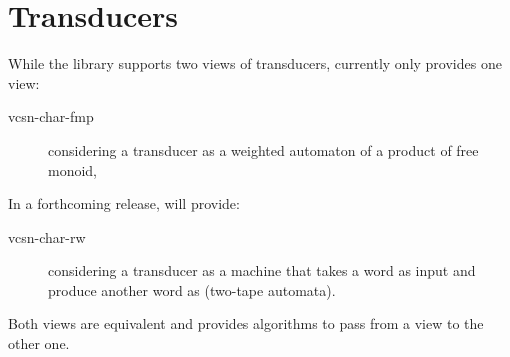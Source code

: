 
\newpage
\section{Transducers}
\label{sec:vcsn-char-fmp}

While the \Vauc library supports two views of transducers, currently
\tafkit only provides one view:

\begin{description}
\item[vcsn-char-fmp] considering a transducer as a weighted automaton of a
  product of free monoid,
\end{description}

In a forthcoming release, \tafkit will provide:

\begin{description}
\item[vcsn-char-rw] considering a transducer as a machine that takes a
  word as input and produce another word as (two-tape automata).
\end{description}

Both views are equivalent and \Vauc provides algorithms to pass from a
view to the other one.

